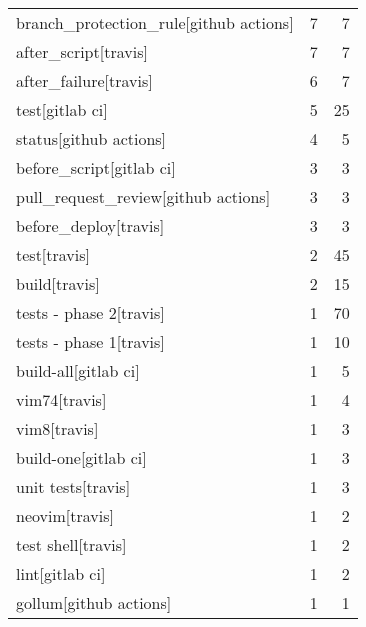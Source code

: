 \begin{tabular}{lrr}
branch\_protection\_rule[github actions]      &                   7 &             7 \\
after\_script[travis]                        &                   7 &             7 \\
after\_failure[travis]                       &                   6 &             7 \\
test[gitlab ci]                             &                   5 &            25 \\
status[github actions]                      &                   4 &             5 \\
before\_script[gitlab ci]                    &                   3 &             3 \\
pull\_request\_review[github actions]         &                   3 &             3 \\
before\_deploy[travis]                       &                   3 &             3 \\
test[travis]                                &                   2 &            45 \\
build[travis]                               &                   2 &            15 \\
tests - phase 2[travis]                     &                   1 &            70 \\
tests - phase 1[travis]                     &                   1 &            10 \\
build-all[gitlab ci]                        &                   1 &             5 \\
vim74[travis]                               &                   1 &             4 \\
vim8[travis]                                &                   1 &             3 \\
build-one[gitlab ci]                        &                   1 &             3 \\
unit tests[travis]                          &                   1 &             3 \\
neovim[travis]                              &                   1 &             2 \\
test shell[travis]                          &                   1 &             2 \\
lint[gitlab ci]                             &                   1 &             2 \\
gollum[github actions]                      &                   1 &             1 \\

\end{tabular}
